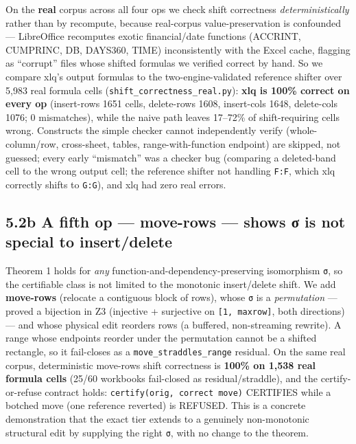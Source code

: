 \documentclass[
  11pt,
]{article}
\begin{document}
On the \textbf{real} corpus across all four ops we check shift
correctness \emph{deterministically} rather than by recompute, because
real-corpus value-preservation is confounded --- LibreOffice recomputes
exotic financial/date functions (ACCRINT, CUMPRINC, DB, DAYS360, TIME)
inconsistently with the Excel cache, flagging as ``corrupt'' files whose
shifted formulas we verified correct by hand. So we compare xlq's output
formulas to the two-engine-validated reference shifter over 5,983 real
formula cells (\texttt{shift\_correctness\_real.py}): \textbf{xlq is
100\% correct on every op} (insert-rows 1651 cells, delete-rows 1608,
insert-cols 1648, delete-cols 1076; 0 mismatches), while the naive path
leaves 17--72\% of shift-requiring cells wrong. Constructs the simple
checker cannot independently verify (whole-column/row, cross-sheet,
tables, range-with-function endpoint) are skipped, not guessed; every
early ``mismatch'' was a checker bug (comparing a deleted-band cell to
the wrong output cell; the reference shifter not handling \texttt{F:F},
which xlq correctly shifts to \texttt{G:G}), and xlq had zero real
errors.

\subsection{5.2b A fifth op --- move-rows --- shows σ is not special to
insert/delete}\label{b-a-fifth-op-move-rows-shows-ux3c3-is-not-special-to-insertdelete}

Theorem 1 holds for \emph{any} function-and-dependency-preserving
isomorphism \texttt{σ}, so the certifiable class is not limited to the
monotonic insert/delete shift. We add \textbf{move-rows} (relocate a
contiguous block of rows), whose \texttt{σ} is a \emph{permutation} ---
proved a bijection in Z3 (injective + surjective on
\texttt{{[}1,\ maxrow{]}}, both directions) --- and whose physical edit
reorders rows (a buffered, non-streaming rewrite). A range whose
endpoints reorder under the permutation cannot be a shifted rectangle,
so it fail-closes as a \texttt{move\_straddles\_range} residual. On the
same real corpus, deterministic move-rows shift correctness is
\textbf{100\% on 1,538 real formula cells} (25/60 workbooks fail-closed
as residual/straddle), and the certify-or-refuse contract holds:
\texttt{certify(orig,\ correct\ move)} CERTIFIES while a botched move
(one reference reverted) is REFUSED. This is a concrete demonstration
that the exact tier extends to a genuinely non-monotonic structural edit
by supplying the right \texttt{σ}, with no change to the theorem.
\end{document}
